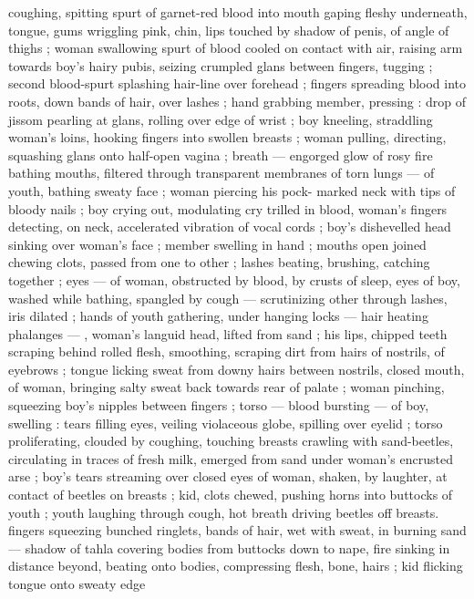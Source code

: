 {coughing, spitting spurt of garnet-red blood into mouth gaping 
fleshy underneath, tongue, gums wriggling pink, chin, lips touched 
by shadow of penis, of angle of thighs ; woman swallowing spurt of 
blood cooled on contact with air, raising arm towards boy's hairy 
pubis, seizing crumpled glans between fingers, tugging ; second 
blood-spurt splashing hair-line over forehead ; fingers spreading 
blood into roots, down bands of hair, over lashes ; hand grabbing 
member, pressing : drop of jissom pearling at glans, rolling over 
edge of wrist ; boy kneeling, straddling woman's loins, hooking 
fingers into swollen breasts ; woman pulling, directing, squashing 
glans onto half-open vagina ; breath --- engorged glow of rosy fire 
bathing mouths, filtered through transparent membranes of torn 
lungs --- of youth, bathing sweaty face ; woman piercing his pock- 
marked neck with tips of bloody nails ; boy crying out, modulating 
cry trilled in blood, woman's fingers detecting, on neck, accelerated 
vibration of vocal cords ; boy's dishevelled head sinking over 
woman's face ; member swelling in hand ; mouths open joined 
chewing clots, passed from one to other ; lashes beating, brushing, 
catching together ; eyes --- of woman, obstructed by blood, by 
crusts of sleep, eyes of boy, washed while bathing, spangled by 
cough --- scrutinizing other through lashes, iris dilated ; hands of 
youth gathering, under hanging locks --- hair heating phalanges --- 
, woman's languid head, lifted from sand ; his lips, chipped teeth 
scraping behind rolled flesh, smoothing, scraping dirt from hairs of 
nostrils, of eyebrows ; tongue licking sweat from downy hairs 
between nostrils, closed mouth, of woman, bringing salty sweat back 
towards rear of palate ; woman pinching, squeezing boy's nipples 
between fingers ; torso --- blood bursting --- of boy, swelling : tears 
filling eyes, veiling violaceous globe, spilling over eyelid ; torso 
proliferating, clouded by coughing, touching breasts crawling with 
sand-beetles, circulating in traces of fresh milk, emerged from sand 
under woman's encrusted arse ; boy's tears streaming over closed 
eyes of woman, shaken, by laughter, at contact of beetles on breasts 
; kid, clots chewed, pushing horns into buttocks of youth ; youth 
laughing through cough, hot breath driving beetles off breasts. 
fingers squeezing bunched ringlets, bands of hair, wet with sweat, in 
burning sand --- shadow of tahla covering bodies from buttocks 
down to nape, fire sinking in distance beyond, beating onto bodies, 
compressing flesh, bone, hairs ; kid flicking tongue onto sweaty edge 
}
